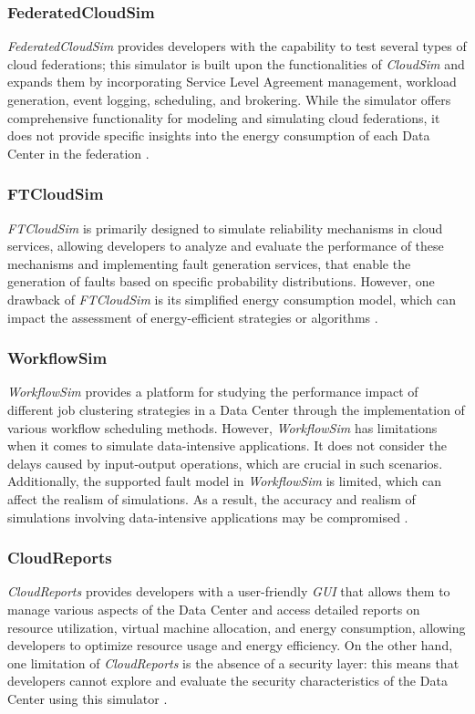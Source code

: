 {\subsubsection*{FederatedCloudSim}
\emph{FederatedCloudSim} \cite{kohne2014federatedcloudsim} provides developers with the capability to test several types of cloud federations; this simulator is built upon the functionalities of \emph{CloudSim} and expands them by incorporating Service Level Agreement management, workload generation, event logging, scheduling, and brokering. While the simulator offers comprehensive functionality for modeling and simulating cloud federations, it does not provide specific insights into the energy consumption of each Data Center in the federation \cite{mansouri2020cloud}.
\subsubsection*{FTCloudSim}
\emph{FTCloudSim} \cite{zhou2013ftcloudsim} is primarily designed to simulate reliability mechanisms in cloud services, allowing developers to analyze and evaluate the performance of these mechanisms and implementing fault generation services, that enable the generation of faults based on specific probability distributions. However, one drawback of \emph{FTCloudSim} is its simplified energy consumption model, which can impact the assessment of energy-efficient strategies or algorithms \cite{mansouri2020cloud}.
\subsubsection*{WorkflowSim}
\emph{WorkflowSim} \cite{chen2012workflowsim} provides a platform for studying the performance impact of different job clustering strategies in a Data Center through the implementation of various workflow scheduling methods. However, \emph{WorkflowSim} has limitations when it comes to simulate data-intensive applications. It does not consider the delays caused by input-output operations, which are crucial in such scenarios. Additionally, the supported fault model in \emph{WorkflowSim} is limited, which can affect the realism of simulations. As a result, the accuracy and realism of simulations involving data-intensive applications may be compromised  \cite{mansouri2020cloud}. 
\subsubsection*{CloudReports}
\emph{CloudReports} \cite{teixeira2014cloudreports} provides developers with a user-friendly \emph{GUI} that allows them to manage various aspects of the Data Center and access detailed reports on resource utilization, virtual machine allocation, and energy consumption, allowing developers to optimize resource usage and energy efficiency. On the other hand, one limitation of \emph{CloudReports} is the absence of a security layer: this means that developers cannot explore and evaluate the security characteristics of the Data Center using this simulator \cite{mansouri2020cloud}.
}
